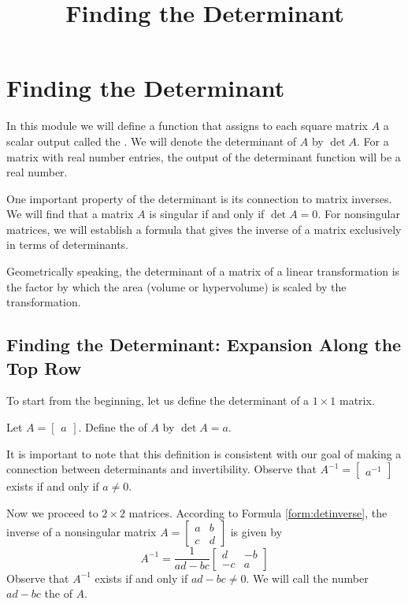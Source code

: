 \documentclass{ximera}
\title{Finding the Determinant} \license{CC BY-NC-SA 4.0}
\begin{document}
\begin{abstract}

\end{abstract}
\maketitle

\section*{Finding the Determinant}
In this module we will define a function that assigns to each square matrix $A$ a scalar output called the .  We will denote the determinant of $A$ by $\det{A}$.  For a matrix with real number entries, the output of the determinant function will be a real number.

One important property of the determinant is its connection to matrix inverses.  We will find that a matrix $A$ is singular if and only if $\det{A}=0$.  For nonsingular matrices, we will establish a formula that gives the inverse of a matrix exclusively in terms of determinants.

Geometrically speaking, the determinant of a matrix of a linear transformation is the factor by which the area (volume or hypervolume) is scaled by the transformation.

\subsection*{Finding the Determinant: Expansion Along the Top Row}
To start from the beginning, let us define the determinant of a $1\times 1$ matrix.
\begin{definition}\label{def:onebyonedet} Let
$A=\begin{bmatrix}a\end{bmatrix}$.  Define the  of $A$ by $\det{A}=a$.
\end{definition}
It is important to note that this definition is consistent with our goal of making a connection between determinants and invertibility.  Observe that $A^{-1}=\begin{bmatrix}a^{-1}\end{bmatrix}$ exists if and only if $a\neq 0$.

Now we proceed to $2\times 2$ matrices.  According to Formula \ref{form:detinverse}, the inverse of a nonsingular matrix $A=\begin{bmatrix}a&b\\c&d\end{bmatrix}$ is given by
$$A^{-1}=\frac{1}{ad-bc}\begin{bmatrix}d&-b\\-c&a\end{bmatrix}$$
Observe that $A^{-1}$ exists if and only if $ad-bc\neq 0$.  We will call the number $ad-bc$ the  of $A$.
\end{document}
